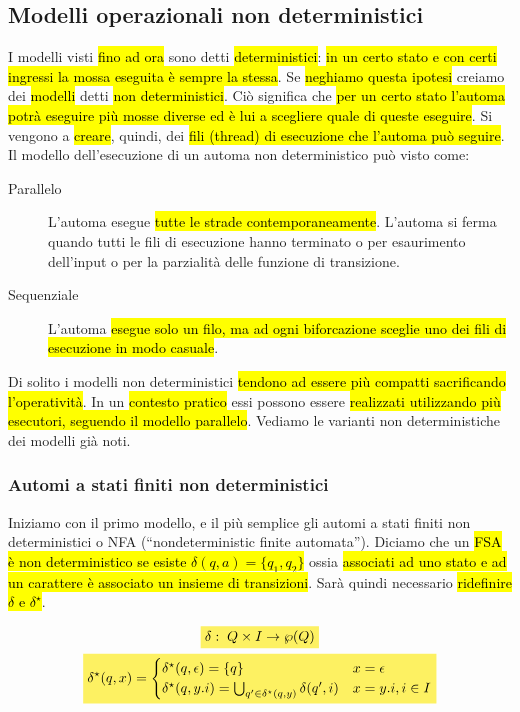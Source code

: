 \documentclass[a4paper,11pt,twoside]{article}
\theoremstyle{plain}
\theoremstyle{definition}
\theoremstyle{remark}
\newcommand{\mhl}[1]{\colorbox{hlcolor}{$\displaystyle #1$}}
\begin{document}
\subsection{Modelli operazionali non deterministici}\label{sec:modelli-non-det}

I modelli visti \hl{fino ad ora} sono detti \hl{deterministici}: \hl{in un certo
stato e con certi ingressi la mossa eseguita è sempre la stessa}. Se
\hl{neghiamo questa ipotesi} creiamo dei \hl{modelli} detti \hl{non
deterministici}. Ciò significa che \hl{per un certo stato l'automa potrà
eseguire più mosse diverse ed è lui a scegliere quale di queste eseguire}. Si
vengono a \hl{creare}, quindi, dei \hl{fili (thread) di esecuzione che l'automa
può seguire}. Il modello dell'esecuzione di un automa non deterministico può
visto come:

\begin{description}
  \item[Parallelo] L'automa esegue \hl{tutte le strade contemporaneamente}.
    L'automa si ferma quando tutti le fili di esecuzione hanno terminato o per
    esaurimento dell'input o per la parzialità delle funzione di transizione.
  \item[Sequenziale] L'automa \hl{esegue solo un filo, ma ad ogni biforcazione
    sceglie uno dei fili di esecuzione in modo casuale}.
\end{description}

Di solito i modelli non deterministici \hl{tendono ad essere più compatti
sacrificando l'operatività}. In un \hl{contesto pratico} essi possono essere
\hl{realizzati utilizzando più esecutori, seguendo il modello parallelo}.
Vediamo le varianti non deterministiche dei modelli già noti.

\subsubsection{Automi a stati finiti non deterministici}\label{sec:nfa}

Iniziamo con il primo modello, e il più semplice gli automi a stati finiti non
deterministici o NFA (``nondeterministic finite automata''). Diciamo che un
\hl{FSA è non deterministico se esiste $\delta(q, a) = \{q_1, q_2\}$} ossia
\hl{associati ad uno stato e ad un carattere è associato un insieme di
transizioni}. Sarà quindi necessario \hl{ridefinire $\delta$ e $\delta^\star$}.

\begin{gather}
  \mhl{ \delta: \; Q \times I \to \wp(Q) } \\
  \mhl{
    \delta^\star(q,x) =
    \begin{cases}
      \delta^\star(q, \epsilon) = \{q\} & x = \epsilon \\
      \delta^\star(q, y.i) = \bigcup_{q' \in \delta^\star(q, y)} \delta(q', i) &
        x=y.i, i \in I
    \end{cases}
  }
\end{gather}
\end{document}

